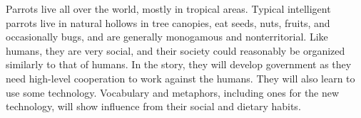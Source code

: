 \documentclass[12pt]{article}
\begin{document}
    Parrots live all over the world, mostly in tropical areas.
    Typical intelligent parrots live in natural hollows in tree canopies,
    eat seeds, nuts, fruits, and occasionally bugs,
    and are generally monogamous and nonterritorial.
    Like humans, they are very social,
    and their society could reasonably be organized similarly to that of humans.
    In the story, they will develop government as they need high-level cooperation
    to work against the humans.
    They will also learn to use some technology.
    Vocabulary and metaphors, including ones for the new technology,
    will show influence from their social and dietary habits.
\end{document}
